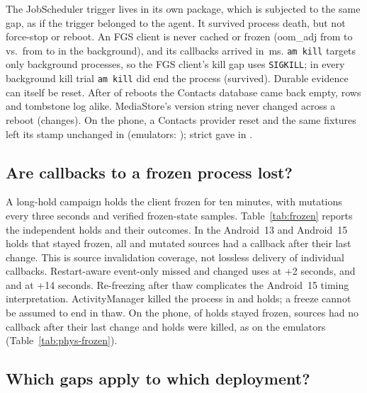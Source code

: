 The JobScheduler trigger lives in its own package, which is subjected to the same gap, as if the trigger belonged to the agent. It survived process death, but not force-stop or reboot. An FGS client is never cached or frozen (oom\_adj from \OomFgMin to \OomFgMax vs.\ from \OomBgMin to \OomBgMax in the background), and its callbacks arrived in \FgLatMs\,ms. \texttt{am kill} targets only background processes, so the FGS client's kill gap uses \texttt{SIGKILL}; in every background kill trial \texttt{am kill} did end the process (\AmkillAlive survived).
Durable evidence can itself be reset. After \RebootEmpty of \RebootN reboots the Contacts database came back empty, rows and tombstone log alike. MediaStore's version string never changed across a reboot (\RebootMediaVer changes).\ifPhysReset{} On the phone, a Contacts provider reset and the same fixtures left its stamp unchanged in \PhysResetSameStamp (emulators: \PhysResetEmuSameStamp); strict \sys gave \Unknown in \PhysResetUnknown.\fi

\subsection{Are callbacks to a frozen process lost?}
\label{sec:meas-frozen}



A long-hold campaign holds the client frozen for ten minutes, with mutations every three seconds and verified frozen-state samples. Table~\ref{tab:frozen} reports the independent holds and their outcomes. In the \NineStayedA Android~13 and \NineStayedB Android~15 holds that stayed frozen, all \NineSrcMutA and \NineSrcMutB mutated sources had a callback after their last change. This is source invalidation coverage, not lossless delivery of individual callbacks. Restart-aware event-only missed \NineEvrEarlyA and \NineEvrEarlyB changed uses at +2 seconds, and \NineEvrLateA and \NineEvrLateB at +14 seconds. Re-freezing after thaw complicates the Android~15 timing interpretation. ActivityManager killed the process in \NineDiedA and \NineDiedB holds; a freeze cannot be assumed to end in thaw. On the phone, \PhysFrozenStayed of \PhysFrozenHolds holds stayed frozen, \PhysFrozenLastUnseen sources had no callback after their last change and \PhysFrozenKilled holds were killed, as on the emulators (Table~\ref{tab:phys-frozen}).

\subsection{Which gaps apply to which deployment?}
\label{sec:meas-deploy}

